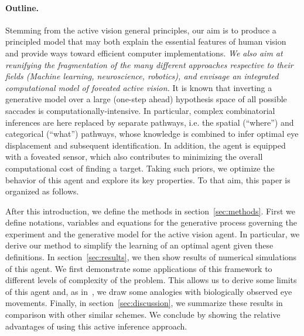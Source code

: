 \paragraph{Outline.}
Stemming from the active vision general principles, our aim is to produce a principled model that may both explain the essential features of human vision and provide ways toward efficient computer implementations. \ICANN
\else
\emph{We also aim at reunifying the fragmentation of the many different approaches respective to their fields (Machine learning, neuroscience, robotics), and envisage an integrated computational model of foveated active vision.}
\fi
It is known that inverting a generative model over a large (one-step ahead) hypothesis space of all possible saccades is computationally-intensive. %
In particular, complex combinatorial inferences are here replaced by separate pathways, i.e. the spatial (``where'') and categorical (``what'') pathways, whose knowledge is combined to infer optimal eye displacement and subsequent identification.    
In addition,  the agent is equipped with a foveated sensor, %
which also contributes to minimizing the overall computational cost of finding a target. Taking such priors, we optimize the behavior of this agent and explore its key properties.
To that aim, this paper is organized as follows.

After this introduction, we define the methods in section~\ref{sec:methods}. First we  define notations, variables and equations for the generative process governing the experiment and the generative model for the active vision agent. In particular, we  derive our method to simplify the learning of an optimal agent given these definitions. In section~\ref{sec:results}, we  then show results of numerical simulations of this agent. We  first demonstrate some applications of this framework to different levels of complexity of the problem. This  allows us to derive some limits of this agent and, as in~\citep{Najemnik05}, we  draw some analogies with biologically observed eye movements. Finally, in section~\ref{sec:discussion}, we  summarize these results in comparison with other similar schemes. We  conclude by showing the relative advantages of using this active inference approach.
